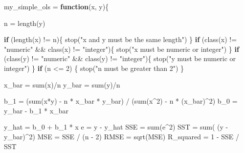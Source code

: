 \documentclass[
]{article}
\newenvironment{Shaded}{\begin{snugshade}}{\end{snugshade}}
\newcommand{\ControlFlowTok}[1]{\textcolor[rgb]{0.13,0.29,0.53}{\textbf{#1}}}
\newcommand{\DecValTok}[1]{\textcolor[rgb]{0.00,0.00,0.81}{#1}}
\newcommand{\FunctionTok}[1]{\textcolor[rgb]{0.00,0.00,0.00}{#1}}
\newcommand{\NormalTok}[1]{#1}
\newcommand{\OtherTok}[1]{\textcolor[rgb]{0.56,0.35,0.01}{#1}}
\newcommand{\SpecialCharTok}[1]{\textcolor[rgb]{0.00,0.00,0.00}{#1}}
\newcommand{\StringTok}[1]{\textcolor[rgb]{0.31,0.60,0.02}{#1}}
\begin{document}
\begin{Shaded}
\begin{Highlighting}[]
\NormalTok{my\_simple\_ols }\OtherTok{=} \ControlFlowTok{function}\NormalTok{(x, y)\{}

\NormalTok{n }\OtherTok{=} \FunctionTok{length}\NormalTok{(y)}

\ControlFlowTok{if}\NormalTok{ (}\FunctionTok{length}\NormalTok{(x) }\SpecialCharTok{!=}\NormalTok{ n)\{}
  \FunctionTok{stop}\NormalTok{(}\StringTok{"x and y must be the same length"}\NormalTok{)}
\NormalTok{\}}
\ControlFlowTok{if}\NormalTok{ (}\FunctionTok{class}\NormalTok{(x) }\SpecialCharTok{!=} \StringTok{"numeric"} \SpecialCharTok{\&\&} \FunctionTok{class}\NormalTok{(x) }\SpecialCharTok{!=} \StringTok{"integer"}\NormalTok{)\{}
  \FunctionTok{stop}\NormalTok{(}\StringTok{"x must be numeric or integer"}\NormalTok{)}
\NormalTok{\}}
\ControlFlowTok{if}\NormalTok{ (}\FunctionTok{class}\NormalTok{(y) }\SpecialCharTok{!=} \StringTok{"numeric"} \SpecialCharTok{\&\&} \FunctionTok{class}\NormalTok{(y) }\SpecialCharTok{!=} \StringTok{"integer"}\NormalTok{)\{}
  \FunctionTok{stop}\NormalTok{(}\StringTok{"y must be numeric or integer"}\NormalTok{)}
\NormalTok{\}}
\ControlFlowTok{if}\NormalTok{ (n }\SpecialCharTok{\textless{}=} \DecValTok{2}\NormalTok{)  \{}
  \FunctionTok{stop}\NormalTok{(}\StringTok{"n must be greater than 2"}\NormalTok{)}
\NormalTok{\}}

\NormalTok{x\_bar }\OtherTok{=} \FunctionTok{sum}\NormalTok{(x)}\SpecialCharTok{/}\NormalTok{n}
\NormalTok{y\_bar }\OtherTok{=} \FunctionTok{sum}\NormalTok{(y)}\SpecialCharTok{/}\NormalTok{n}

\NormalTok{b\_1 }\OtherTok{=}\NormalTok{ (}\FunctionTok{sum}\NormalTok{(x}\SpecialCharTok{*}\NormalTok{y) }\SpecialCharTok{{-}}\NormalTok{ n }\SpecialCharTok{*}\NormalTok{ x\_bar }\SpecialCharTok{*}\NormalTok{ y\_bar) }\SpecialCharTok{/}\NormalTok{ (}\FunctionTok{sum}\NormalTok{(x}\SpecialCharTok{\^{}}\DecValTok{2}\NormalTok{) }\SpecialCharTok{{-}}\NormalTok{ n }\SpecialCharTok{*}\NormalTok{ (x\_bar)}\SpecialCharTok{\^{}}\DecValTok{2}\NormalTok{)}
\NormalTok{b\_0 }\OtherTok{=}\NormalTok{ y\_bar }\SpecialCharTok{{-}}\NormalTok{ b\_1 }\SpecialCharTok{*}\NormalTok{ x\_bar}

\NormalTok{y\_hat }\OtherTok{=}\NormalTok{ b\_0 }\SpecialCharTok{+}\NormalTok{ b\_1 }\SpecialCharTok{*}\NormalTok{ x}
\NormalTok{e }\OtherTok{=}\NormalTok{ y }\SpecialCharTok{{-}}\NormalTok{ y\_hat}
\NormalTok{SSE }\OtherTok{=} \FunctionTok{sum}\NormalTok{(e}\SpecialCharTok{\^{}}\DecValTok{2}\NormalTok{)}
\NormalTok{SST }\OtherTok{=} \FunctionTok{sum}\NormalTok{( (y }\SpecialCharTok{{-}}\NormalTok{ y\_bar)}\SpecialCharTok{\^{}}\DecValTok{2}\NormalTok{)}
\NormalTok{MSE }\OtherTok{=}\NormalTok{ SSE }\SpecialCharTok{/}\NormalTok{ (n }\SpecialCharTok{{-}} \DecValTok{2}\NormalTok{)}
\NormalTok{RMSE }\OtherTok{=} \FunctionTok{sqrt}\NormalTok{(MSE)}
\NormalTok{R\_squared }\OtherTok{=} \DecValTok{1} \SpecialCharTok{{-}}\NormalTok{ SSE }\SpecialCharTok{/}\NormalTok{ SST}


\end{Highlighting}
\end{Shaded}
\end{document}
